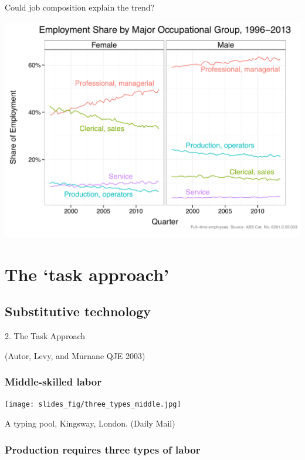 \documentclass[red]{beamer}
\begin{document}
\begin{frame}{Could job composition explain the trend?}
  \begin{center}
    \includegraphics[width=\textwidth]{slides_fig/occ_share_sex.pdf}
  \end{center}
\end{frame}

\section{The `task approach'}
\subsection{Substitutive technology}
\begin{frame}[c]
\begin{center}  2. The Task Approach \end{center}


\vspace{50pt}
(Autor, Levy, and Murnane QJE 2003)
\end{frame}


\begin{frame}[c]
\frametitle{Middle-skilled labor}
\begin{center}
  \texttt{[image: slides\_fig/three\_types\_middle.jpg]}
\end{center}
A typing pool, Kingsway, London. (Daily Mail)
\end{frame}

\begin{frame}[c]
\frametitle{Production requires three types of labor}
\begin{center}
  \vspace{-10pt}
\end{center}
\end{frame}
\end{document}

